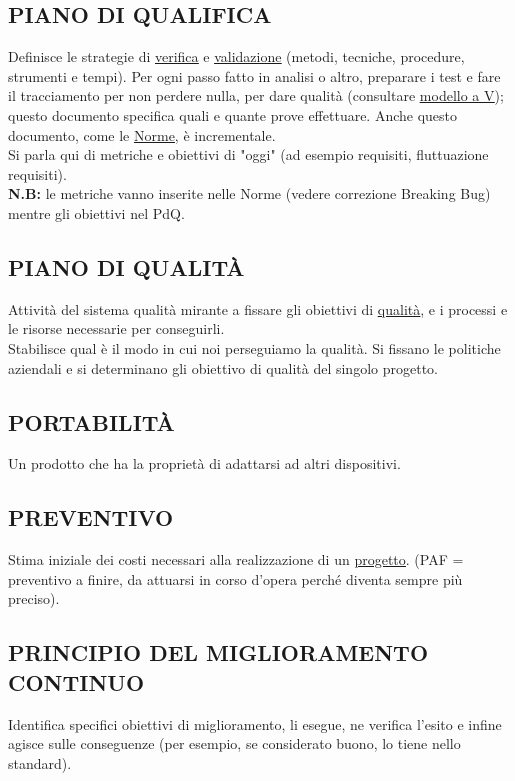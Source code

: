 		\subsection{PIANO DI QUALIFICA}		\label{pianoqualifica}
		Definisce le strategie di \underline{\hyperref[verificare]{verifica}} e \underline{\hyperref[validare]{validazione}} (metodi, tecniche, procedure, strumenti e tempi). Per ogni passo fatto in analisi o altro, preparare i test e fare il tracciamento per non perdere nulla, per dare qualità (consultare \underline{\hyperref[V]{modello a V}}); questo documento specifica quali e quante prove effettuare. Anche questo documento, come le \underline{\hyperref[norme]{Norme}}, è incrementale. \\
		Si parla qui di metriche e obiettivi di "oggi" (ad esempio requisiti, fluttuazione requisiti). \\
		\textbf{N.B:} le metriche vanno inserite nelle Norme (vedere correzione Breaking Bug) mentre gli obiettivi nel PdQ.
		

		\subsection{PIANO DI QUALITÀ}		\label{pianoqualita} %
		Attività del sistema qualità mirante a fissare gli obiettivi di \underline{\hyperref[qualita]{qualità}}, e i processi e le risorse necessarie per conseguirli. \\
		Stabilisce qual è il modo in cui noi perseguiamo la qualità. Si fissano le politiche aziendali e si determinano gli obiettivo di qualità del singolo progetto.
		

		\subsection{PORTABILITÀ}		\label{portabilita}
		Un prodotto che ha la proprietà di adattarsi ad altri dispositivi.
			  
		
		\subsection{PREVENTIVO}  \label{preventivo}
		Stima iniziale dei costi necessari alla realizzazione di un \underline{\hyperref[progetto]{progetto}}. (PAF = preventivo a finire, da attuarsi in corso d'opera perché diventa sempre più preciso).
	

		\subsection{PRINCIPIO DEL MIGLIORAMENTO CONTINUO}  \label{miglioramentocontinuo}
		Identifica specifici obiettivi di miglioramento, li esegue, ne verifica l'esito e infine agisce sulle conseguenze (per esempio, se considerato buono, lo tiene nello standard).
		

